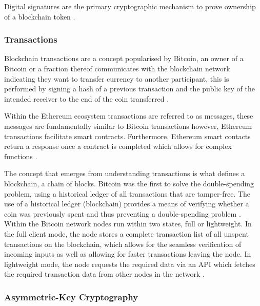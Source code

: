 Digital signatures are the primary cryptographic mechanism to prove ownership of a blockchain token \autocite{nakamotoBitcoinPeertoPeerElectronic2008}. 

\subsubsection{Transactions}

Blockchain transactions are a concept popularised by Bitcoin, an owner of a Bitcoin or a fraction thereof communicates with the blockchain network indicating they want to transfer currency to another participant, this is performed by signing a hash of a previous transaction and the public key of the intended receiver to the end of the coin transferred \autocite{nakamotoBitcoinPeertoPeerElectronic2008} \autocite{assiaColoredCoinsWhite2015} \autocite{antonopoulosMasteringBitcoin2017}. \par Within the Ethereum ecosystem transactions are referred to as messages, these messages are fundamentally similar to Bitcoin transactions however, Ethereum transactions facilitate smart contracts. Furthermore, Ethereum smart contacts return a response once a contract is completed which allows for complex functions \autocite{vitalikEthereumWhitepaper2014}. \par The concept that emerges from understanding transactions is what defines a blockchain, a chain of blocks. Bitcoin was the first to solve the double-spending problem, using a historical ledger of all transactions that are tamper-free. The use of a historical ledger (blockchain) provides a means of verifying whether a coin was previously spent and thus preventing a double-spending problem \autocite{narayananBitcoinCryptocurrencyTechnologies2016}. Within the Bitcoin network nodes run within two states, full or lightweight. In the full client mode, the node stores a complete transaction list of all unspent transactions on the blockchain, which allows for the seamless verification of incoming inputs as well as allowing for faster transactions leaving the node. In lightweight mode, the node requests the required data via an API which fetches the required transaction data from other nodes in the network \autocite{antonopoulosMasteringBitcoin2017}. 

\subsubsection{Asymmetric-Key Cryptography}

